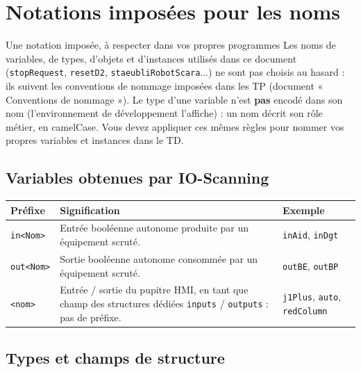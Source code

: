 \section{Notations imposées pour les noms}
\label{secNotations}

\begin{UPSTIinfor}{Une notation imposée, à respecter dans vos propres programmes}
Les noms de variables, de types, d'objets et d'instances utilisés dans ce document
(\texttt{stopRequest}, \texttt{resetD2}, \texttt{staeubliRobotScara}...) ne sont
pas choisis au hasard : ils suivent les conventions de nommage imposées dans les TP (document
« Conventions de nommage »). Le type d'une variable n'est \textbf{pas} encodé dans son nom
(l'environnement de développement l'affiche) : un nom décrit son rôle métier, en camelCase.
Vous devez appliquer ces mêmes règles pour nommer vos propres variables et instances dans le TD.
\end{UPSTIinfor}

\subsection{Variables obtenues par IO-Scanning}
\label{secNotationsIoScanning}

\begin{center}
    \begin{tabular}{|p{2.8cm}|p{6.5cm}|p{5cm}|}
        \hline
        \textbf{Préfixe} & \textbf{Signification} & \textbf{Exemple} \\
        \hline
        \texttt{in<Nom>} & Entrée booléenne autonome produite par un équipement scruté. & \texttt{inAid}, \texttt{inDgt} \\
        \hline
        \texttt{out<Nom>} & Sortie booléenne autonome consommée par un équipement scruté. & \texttt{outBE}, \texttt{outBP} \\
        \hline
        \texttt{<nom>} & Entrée / sortie du pupitre HMI, en tant que champ des structures dédiées \texttt{inputs} / \texttt{outputs} : pas de préfixe. & \texttt{j1Plus}, \texttt{auto}, \texttt{redColumn} \\
        \hline
    \end{tabular}
\end{center}

\subsection{Types et champs de structure}
\label{secNotationsTypes}

